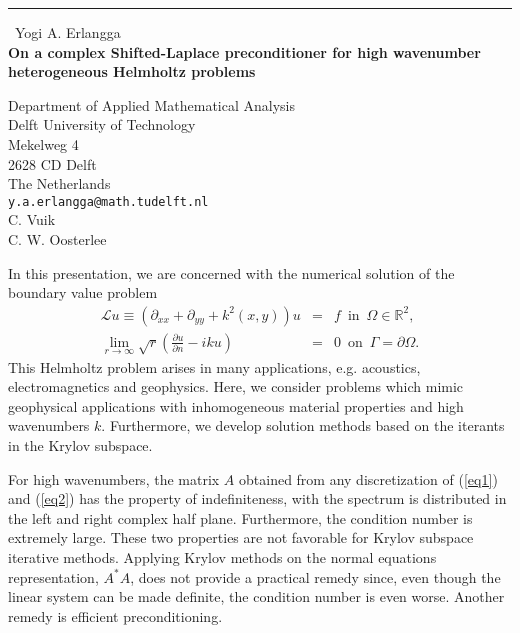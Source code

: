 \documentclass{report}
\begin{document}
\begin{center}
\rule{6in}{1pt} \
{\large Yogi A. Erlangga \\
{\bf On a complex Shifted-Laplace preconditioner for high wavenumber heterogeneous Helmholtz problems}}

Department of Applied Mathematical Analysis \\ Delft University of Technology \\ Mekelweg 4 \\ 2628 CD Delft \\ The Netherlands
\\
{\tt y.a.erlangga@math.tudelft.nl}\\
C. Vuik\\
C. W. Oosterlee\end{center}

In this presentation, we are concerned with the numerical solution of the
boundary value problem
\begin{eqnarray}
\mathcal{L} u \equiv \left( \partial_{xx} + \partial_{yy} + k^2(x,y) \right) u
&=& f \, \, \, \text{in} \, \, \, \Omega \in \mathbb{R}^2, \label{eq1}\\
\lim_{r \rightarrow \infty} \sqrt{r} \left(\frac{\partial u}{\partial n}
- i k u \right) &=& 0 \, \, \, \text{on} \, \, \, \Gamma = \partial \Omega. \label{eq2}
\end{eqnarray}
This Helmholtz problem arises in many applications, e.g. acoustics,
electromagnetics and geophysics. Here, we consider problems which mimic
geophysical applications with inhomogeneous material properties and high
wavenumbers $k$. Furthermore, we develop solution methods based on the
iterants in the Krylov subspace.

For high wavenumbers, the matrix $A$ obtained from any discretization of
(\ref{eq1}) and (\ref{eq2}) has the property of indefiniteness, with the
spectrum is distributed in the left and right complex half plane.
Furthermore, the condition number is extremely large. These two
properties are not favorable for Krylov subspace iterative methods.
Applying Krylov methods on the normal equations representation, $A^*A$,
does not provide a practical remedy since, even though the linear system
can be made definite, the condition number is even worse. Another remedy
is efficient preconditioning.
\end{document}
